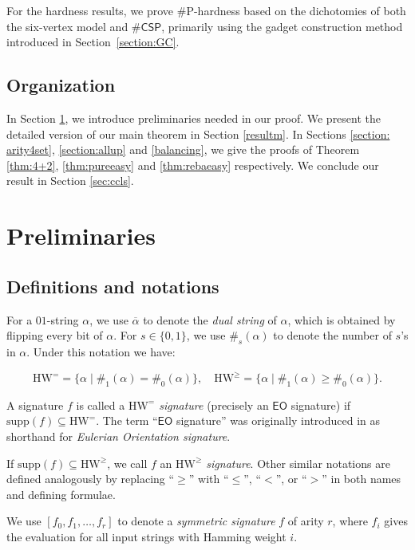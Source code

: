 \documentclass[a4paper,UKenglish,cleveref, autoref, thm-restate]{lipics-v2021}
\newcommand{\eo}[0]{\textsf{EO}}
\newcommand{\csp}[0]{\textsf{CSP}}
\newcommand{\eoe}[0]{\text{HW}^=}
\newcommand{\eog}[0]{\text{HW}^\geq}
\newcommand{\su}[0]{\text{supp}}
\begin{document}
For the hardness results, we prove \#P-hardness based on the dichotomies of both the six-vertex model and $\#\csp$, primarily using the gadget construction method introduced in Section~\ref{section:GC}.

\subsection{Organization}

In Section \ref{section:preli}, we introduce preliminaries needed in our proof. We present the detailed version of our main theorem in Section \ref{resultm}. In Sections \ref{section: arity4set}, \ref{section:allup} and \ref{balancing}, we give the proofs of Theorem \ref{thm:4+2}, \ref{thm:pureeasy} and \ref{thm:rebaeasy} respectively. We conclude our result in Section \ref{sec:ccls}. 

\section{Preliminaries}\label{section:preli}

\subsection{Definitions and notations}



For a $01$-string $\alpha$, we use $\overline\alpha$ to denote the \textit{dual string} of $\alpha$, which is obtained by flipping every bit of $\alpha$. For $s\in \{0,1\}$, we use $\#_s(\alpha)$ to denote the number of $s$'s in $\alpha$. Under this notation we have:

$$\eoe=\{\alpha \mid \#_1(\alpha)=\#_0(\alpha)\}, \quad \eog=\{\alpha \mid \#_1(\alpha)\geq \#_0(\alpha)\}.$$

A signature $f$ is called a \textit{$\eoe$ signature} (precisely an $\eo$ signature) if $\su(f) \subseteq \eoe$. The term ``$\eo$ signature'' was originally introduced in \cite{cai2020beyond} as shorthand for \textit{Eulerian Orientation signature}.

If $\su(f) \subseteq \eog$, we call $f$ an \textit{$\eog$ signature}. Other similar notations are defined analogously by replacing ``$\geq$'' with ``$\leq$'', ``$<$'', or ``$>$'' in both names and defining formulae.


We use $[f_0, f_1, \ldots, f_r]$ to denote a \textit{symmetric signature} $f$ of arity $r$, where $f_i$ gives the evaluation for all input strings with Hamming weight $i$. 
\end{document}
